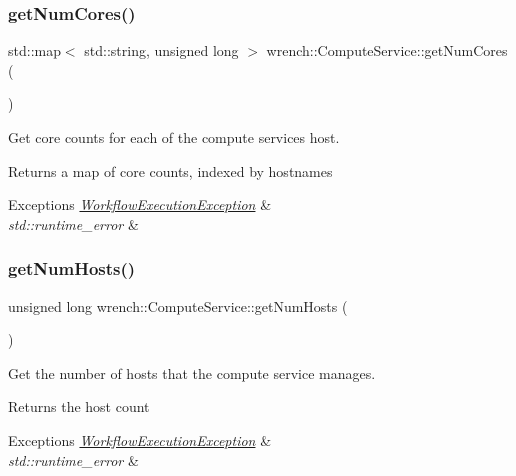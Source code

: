\subsubsection{\texorpdfstring{get\+Num\+Cores()}{getNumCores()}}
{\footnotesize\ttfamily std\+::map$<$ std\+::string, unsigned long $>$ wrench\+::\+Compute\+Service\+::get\+Num\+Cores (\begin{DoxyParamCaption}{ }\end{DoxyParamCaption})}



Get core counts for each of the compute service\textquotesingle{}s host. 

\begin{DoxyReturn}{Returns}
a map of core counts, indexed by hostnames
\end{DoxyReturn}

\begin{DoxyExceptions}{Exceptions}
{\em \hyperlink{classwrench_1_1_workflow_execution_exception}{Workflow\+Execution\+Exception}} & \\
\hline
{\em std\+::runtime\+\_\+error} & \\
\hline
\end{DoxyExceptions}
\mbox{\label{classwrench_1_1_compute_service_a1b576a22529bd638e6998f0513a44b36}} 
\subsubsection{\texorpdfstring{get\+Num\+Hosts()}{getNumHosts()}}
{\footnotesize\ttfamily unsigned long wrench\+::\+Compute\+Service\+::get\+Num\+Hosts (\begin{DoxyParamCaption}{ }\end{DoxyParamCaption})}



Get the number of hosts that the compute service manages. 

\begin{DoxyReturn}{Returns}
the host count
\end{DoxyReturn}

\begin{DoxyExceptions}{Exceptions}
{\em \hyperlink{classwrench_1_1_workflow_execution_exception}{Workflow\+Execution\+Exception}} & \\
\hline
{\em std\+::runtime\+\_\+error} & \\
\hline
\end{DoxyExceptions}
\mbox{\label{classwrench_1_1_compute_service_a7d717171627835491772e589c4e6101f}} 
